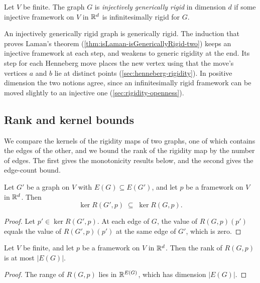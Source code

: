 \begin{definition}
  \label{def:isGenericallyRigidInj}
  \leanok
  Let $V$ be finite. The graph $G$ is \emph{injectively generically
  rigid} in dimension $d$ if some injective framework on $V$ in
  ${\mathbb{R}}^{d}$ is infinitesimally rigid for $G$.
\end{definition}
An injectively generically rigid graph is generically rigid. The
induction that proves Laman's theorem
(\cref{thm:isLaman-isGenericallyRigid-two}) keeps an injective
framework at each step, and weakens to generic rigidity at the end. Its
step for each Henneberg move places the new vertex using that the
move's vertices $a$ and $b$ lie at distinct points
(\cref{sec:henneberg-rigidity}). In positive dimension the two notions
agree, since an infinitesimally rigid framework can be moved slightly
to an injective one (\cref{sec:rigidity-openness}).

\subsection{Rank and kernel bounds}

We compare the kernels of the rigidity maps of two graphs, one of which
contains the edges of the other, and we bound the rank of the rigidity
map by the number of edges. The first gives the monotonicity results
below, and the second gives the edge-count bound.

\begin{lemma}
  \label{lem:rigidityMap-ker-mono}
  \leanok
  Let $G'$ be a graph on $V$ with $E(G) \subseteq E(G')$, and let $p$
  be a framework on $V$ in ${\mathbb{R}}^{d}$. Then
  \[
    \ker R(G', p) \;\subseteq\; \ker R(G, p).
  \]
\end{lemma}
\begin{proof}
  \leanok
  Let $p' \in \ker R(G', p)$. At each edge of $G$, the value of
  $R(G, p)(p')$ equals the value of $R(G', p)(p')$ at the same edge of
  $G'$, which is zero.
\end{proof}

\begin{lemma}
  \label{lem:rigidityMap-finrank-range-le}
  \leanok
  Let $V$ be finite, and let $p$ be a framework on $V$ in ${\mathbb{R}}^{d}$.
  Then the rank of $R(G, p)$ is at most $|E(G)|$.
\end{lemma}
\begin{proof}
  \leanok
  The range of $R(G, p)$ lies in ${\mathbb{R}}^{E(G)}$, which has dimension
  $|E(G)|$.
\end{proof}

